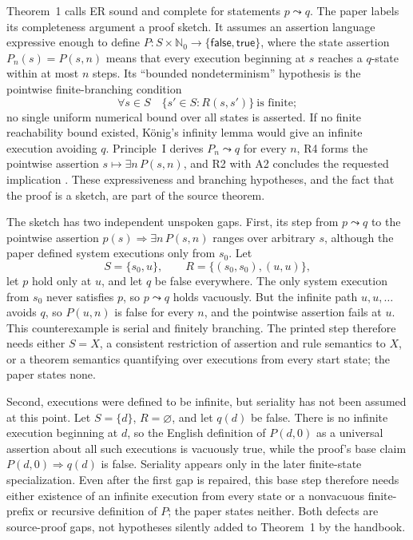 Theorem~1 calls ER sound and complete for statements
\(p\leadsto q\).  The paper labels its completeness argument a proof sketch.
It assumes an assertion language expressive enough to define
\(P:S\times\mathbb N_0\to\{\mathsf{false},\mathsf{true}\}\), where the state
assertion \(P_n(s)=P(s,n)\) means that every execution beginning at \(s\)
reaches a \(q\)-state within at most \(n\) steps.  Its ``bounded
nondeterminism'' hypothesis is the
pointwise finite-branching condition
\[
 \forall s\in S\quad
 \{s'\in S:R(s,s')\}\ \text{is finite};
\]
no single uniform numerical bound over all states is asserted.  If no finite
reachability bound existed, K\"onig's infinity lemma would give an infinite
execution avoiding \(q\).  Principle~I derives
\(P_n\leadsto q\) for every \(n\), R4 forms the pointwise assertion
\(s\mapsto\exists n\,P(s,n)\), and R2 with A2
concludes the requested implication
\cite[pp.~49--50]{Pnueli1977}.  These expressiveness and branching hypotheses,
and the fact that the proof is a sketch, are part of the source theorem.

The sketch has two independent unspoken gaps.  First, its step from
\(p\leadsto q\) to the pointwise assertion
\(p(s)\Rightarrow\exists n\,P(s,n)\) ranges over arbitrary \(s\), although the
paper defined system executions only from \(s_0\).  Let
\[
 S=\{s_0,u\},\qquad
 R=\{(s_0,s_0),(u,u)\},
\]
let \(p\) hold only at \(u\), and let \(q\) be false everywhere.  The only
system execution from \(s_0\) never satisfies \(p\), so \(p\leadsto q\) holds
vacuously.  But the infinite path \(u,u,\ldots\) avoids \(q\), so \(P(u,n)\)
is false for every \(n\), and the pointwise assertion fails at \(u\).  This
counterexample is serial and finitely branching.  The printed step therefore
needs either \(S=X\), a consistent restriction of assertion and rule semantics
to \(X\), or a theorem semantics quantifying over executions from every start
state; the paper states none.

Second, executions were defined to be infinite, but seriality has not been
assumed at this point.  Let \(S=\{d\}\), \(R=\varnothing\), and let \(q(d)\)
be false.  There is no infinite execution beginning at \(d\), so the English
definition of \(P(d,0)\) as a universal assertion about all such executions is
vacuously true, while the proof's base claim
\(P(d,0)\Rightarrow q(d)\) is false.  Seriality appears only in the later
finite-state specialization.  Even after the first gap is repaired, this base
step therefore needs either existence of an infinite execution from every
state or a nonvacuous finite-prefix or recursive definition of \(P\); the paper
states neither.  Both defects are source-proof gaps, not hypotheses silently
added to Theorem~1 by the handbook.

